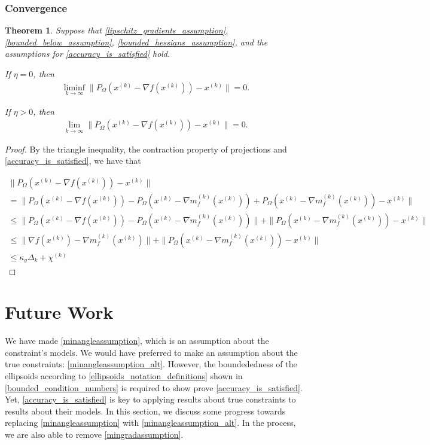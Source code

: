 \documentclass{article}
\newtheorem{theorem}{Theorem}[section]
\theoremstyle{case}
\numberwithin{theorem}{subsection}
\newcommand{\chik}{{\chi^{(k)}}}
\newcommand{\gk}{{\nabla m_f^{(k)}\left(x^{(k)}\right)}}
\newcommand{\gradf}{\nabla f}
\newcommand{\xk}{{x^{(k)}}}
\begin{document}
\subsubsection{Convergence}

\begin{theorem}
\label{the_convergence_theorem}
Suppose that \cref{lipschitz_gradients_assumption}, \cref{bounded_below_assumption}, \cref{bounded_hessians_assumption}, and 
the assumptions for \cref{accuracy_is_satisfied} hold.

If $\eta = 0$, then
\begin{align}
\liminf_{k\to\infty} \|P_{\Omega}(\xk - \gradf(\xk)) - \xk \| = 0.
\end{align}

If $\eta > 0$, then
\begin{align}
\lim_{k\to\infty} \|P_{\Omega}(\xk - \gradf(\xk)) - \xk \| = 0.
\end{align}

\end{theorem}



\begin{proof}
By the triangle inequality, the contraction property of projections and \cref{accuracy_is_satisfied}, we have that

\begin{align*}
\|P_{\Omega}(\xk - \gradf(\xk)) - \xk \| \\
= \|P_{\Omega}(\xk - \gradf(\xk)) - P_{\Omega}(\xk - \gk) + P_{\Omega}(\xk - \gk) - \xk\| \\
\le \|P_{\Omega}(\xk - \gradf(\xk)) - P_{\Omega}(\xk - \gk)\| + \|P_{\Omega}(\xk - \gk) - \xk\| \\
\le \|\gradf(\xk) - \gk\| + \|P_{\Omega}(\xk - \gk) - \xk\| \\
\le \kappa_{g} \Delta_k + \chik
\end{align*}
\end{proof}

\section{Future Work}
\label{alternative_assumptions_section}

We have made \cref{minangleassumption}, which is an assumption about the constraint's models.
We would have preferred to make an assumption about the true constraints: \cref{minangleassumption_alt}.
However, the boundededness of the ellipsoids according to \cref{ellipsoids_notation_definitions} shown in \cref{bounded_condition_numbers}
is required to show prove \cref{accuracy_is_satisfied}.
Yet, \cref{accuracy_is_satisfied} is key to applying results about true constraints to results about their models.
In this section, we discuss some progress towards replacing \cref{minangleassumption} with \cref{minangleassumption_alt}.
In the process, we are also able to remove \cref{mingradassumption}.
\end{document}
